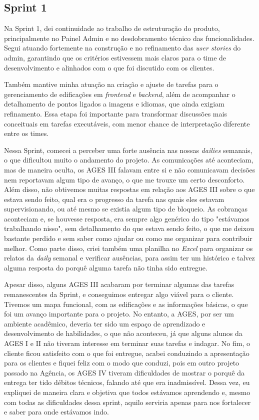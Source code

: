 \subsection{Sprint 1}

Na Sprint 1, dei continuidade ao trabalho de estruturação do produto, principalmente no Painel Admin e no desdobramento técnico das funcionalidades. Segui atuando fortemente na construção e no refinamento das \textit{user stories} do admin, garantindo que os critérios estivessem mais claros para o time de desenvolvimento e alinhados com o que foi discutido com os clientes.

Também mantive minha atuação na criação e ajuste de tarefas para o gerenciamento de edificações em \textit{frontend} e \textit{backend}, além de acompanhar o detalhamento de pontos ligados a imagens e idiomas, que ainda exigiam refinamento. Essa etapa foi importante para transformar discussões mais conceituais em tarefas executáveis, com menor chance de interpretação diferente entre os times.

Nessa Sprint, comecei a perceber uma forte ausência nas nossas \textit{dailies} semanais, o que dificultou muito o andamento do projeto. As comunicações até aconteciam, mas de maneira oculta, os AGES III falavam entre si e não comunicavam decisões nem reportavam algum tipo de avanço, o que me trouxe um certo desconforto. Além disso, não obtivemos muitas respostas em relação aos AGES III sobre o que estava sendo feito, qual era o progresso da tarefa nas quais eles estavam supervisionando, ou até mesmo se existia algum tipo de bloqueio. As cobranças aconteciam e, se houvesse resposta, era sempre algo genérico do tipo "estávamos trabalhando nisso", sem detalhamento do que estava sendo feito, o que me deixou bastante perdido e sem saber como ajudar ou como me organizar para contribuir melhor. Como parte disso, criei também uma planilha no \textit{Excel} para organizar os relatos da \textit{daily} semanal e verificar ausências, para assim ter um histórico e talvez alguma resposta do porquê alguma tarefa não tinha sido entregue.

Apesar disso, alguns AGES III acabaram por terminar algumas das tarefas remanescentes da Sprint, e conseguimos entregar algo viável para o cliente. Tivemos um mapa funcional, com as edificações e as informações básicas, o que foi um avanço importante para o projeto. No entanto, a AGES, por ser um ambiente acadêmico, deveria ter sido um espaço de aprendizado e desenvolvimento de habilidades, o que não aconteceu, já que alguns alunos da AGES I e II não tiveram interesse em terminar suas tarefas e indagar. No fim, o cliente ficou satisfeito com o que foi entregue, acabei conduzindo a apresentação para os clientes e fiquei feliz com o modo que conduzi, pois em outro projeto passado na Agência, os AGES IV tiveram dificuldades de mostrar o porquê da entrega ter tido débitos técnicos, falando até que era inadmissível. Dessa vez, eu expliquei de maneira clara e objetiva que todos estávamos aprendendo e, mesmo com todas as dificuldades dessa sprint, aquilo serviria apenas para nos fortalecer e saber para onde estávamos indo.

